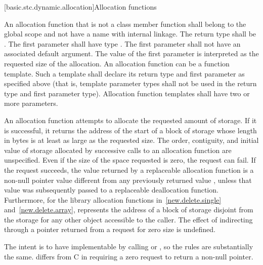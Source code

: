 
[basic.stc.dynamic.allocation]{Allocation functions}

\pnum
{}%
An allocation function that is not a class member function
shall belong to the global scope and not have a name with internal linkage.
The return type shall be . The first
parameter shall have type . The
first parameter shall not have an associated default
argument. The value of the first parameter
is interpreted as the requested size of the allocation. An allocation
function can be a function template. Such a template shall declare its
return type and first parameter as specified above (that is, template
parameter types shall not be used in the return type and first parameter
type). Allocation function templates shall have two or more parameters.

\pnum
An allocation function attempts to allocate the requested amount of
storage. If it is successful, it returns the address of the start
of a block of storage whose length in bytes is at least as large
as the requested size.
The order,
contiguity, and initial value of storage allocated by successive calls
to an allocation function are unspecified.
Even if the size of the space
requested is zero, the request can fail. If the request succeeds, the
value returned by a replaceable allocation function
is a non-null pointer value
 different from any previously returned value ,
unless that value  was subsequently passed to a
replaceable deallocation function.
Furthermore, for the library allocation functions
in~\ref{new.delete.single} and~\ref{new.delete.array},
 represents the address of a block of storage disjoint from the storage
for any other object accessible to the caller.
The effect of indirecting through a pointer
returned from a request for zero size is undefined.
\begin{footnote}
The intent is
to have  implementable by
calling  or , so the rules are
substantially the same. \Cpp{} differs from C in requiring a zero request
to return a non-null pointer.
\end{footnote}

